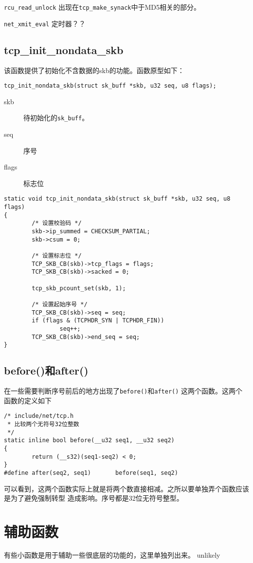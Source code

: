	\texttt{rcu_read_unlock} 出现在\texttt{tcp_make_synack}中于MD5相关的部分。
	
	\texttt{net_xmit_eval}	定时器？？
\subsection{tcp\_init\_nondata\_skb}
该函数提供了初始化不含数据的skb的功能。函数原型如下：
\begin{verbatim}
tcp_init_nondata_skb(struct sk_buff *skb, u32 seq, u8 flags);
\end{verbatim}

\begin{description}
  \item[skb] 待初始化的\texttt{sk_buff}。
  \item[seq] 序号
  \item[flags] 标志位
\end{description}

\begin{verbatim}
static void tcp_init_nondata_skb(struct sk_buff *skb, u32 seq, u8 flags)
{
        /* 设置校验码 */
        skb->ip_summed = CHECKSUM_PARTIAL;
        skb->csum = 0;

        /* 设置标志位 */
        TCP_SKB_CB(skb)->tcp_flags = flags;
        TCP_SKB_CB(skb)->sacked = 0;

        tcp_skb_pcount_set(skb, 1);

        /* 设置起始序号 */
        TCP_SKB_CB(skb)->seq = seq;
        if (flags & (TCPHDR_SYN | TCPHDR_FIN))
                seq++;
        TCP_SKB_CB(skb)->end_seq = seq;
}
\end{verbatim}

\subsection{before()和after()}
在一些需要判断序号前后的地方出现了\texttt{before()}和\texttt{after()}
这两个函数。这两个函数的定义如下
\begin{verbatim}
/* include/net/tcp.h
 * 比较两个无符号32位整数
 */
static inline bool before(__u32 seq1, __u32 seq2)
{
        return (__s32)(seq1-seq2) < 0;
}
#define after(seq2, seq1)       before(seq1, seq2)
\end{verbatim}
可以看到，这两个函数实际上就是将两个数直接相减。之所以要单独弄个函数应该是为了避免强制转型
造成影响。序号都是32位无符号整型。

\section{辅助函数}
有些小函数是用于辅助一些很底层的功能的，这里单独列出来。
                unlikely
